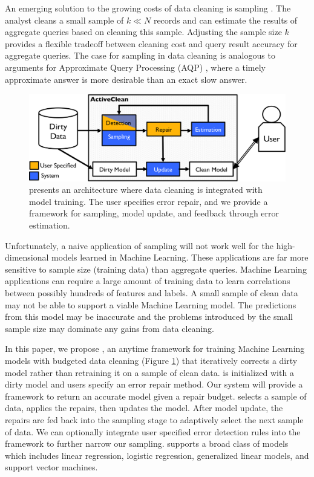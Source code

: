 An emerging solution to the growing costs of data cleaning is sampling \cite{wang1999sample}. The analyst cleans a small sample of $k \ll N$ records and can estimate the results of aggregate queries based on cleaning this sample.
Adjusting the sample size $k$ provides a flexible tradeoff between cleaning cost and query result accuracy for aggregate queries.
The case for sampling in data cleaning is analogous to arguments for Approximate Query Processing (AQP) \cite{DBLP:conf/eurosys/AgarwalMPMMS13}, where a timely approximate answer is more desirable than an exact slow answer. 

\begin{figure}[t]
\centering
 \includegraphics[width=\columnwidth]{figs/arch.png}
 \caption{\sysfull presents an architecture where data cleaning is integrated with model training. The user specifies error repair, and we provide a framework for sampling, model update, and feedback through error estimation. \label{sys-arch}}\vspace{-2em}
\end{figure}

Unfortunately, a naive application of sampling will not work well for the high-dimensional models learned in Machine Learning.
These applications are far more sensitive to sample size (training data) than aggregate queries.
Machine Learning applications can require a large amount of training data to learn correlations between possibly hundreds of features and labels.
A small sample of clean data may not be able to support a viable Machine Learning model.
The predictions from this model may be inaccurate and the problems introduced by the small sample size may dominate any gains from data cleaning. 

In this paper, we propose \sys, an anytime framework for training Machine Learning models with budgeted data cleaning (Figure \ref{sys-arch}) that iteratively corrects a dirty model rather than retraining it on a sample of clean data.
\sys is initialized with a dirty model and users specify an error repair method.
Our system will provide a framework to return an accurate model given a repair budget.
\sys selects a sample of data, applies the repairs, then updates the model.
After model update, the repairs are fed back into the sampling stage to adaptively select the next sample of data.
We can optionally integrate user specified error detection rules into the framework to further narrow our sampling.
\sys supports a broad class of models which includes linear regression, logistic regression, generalized linear models, and support vector machines.

